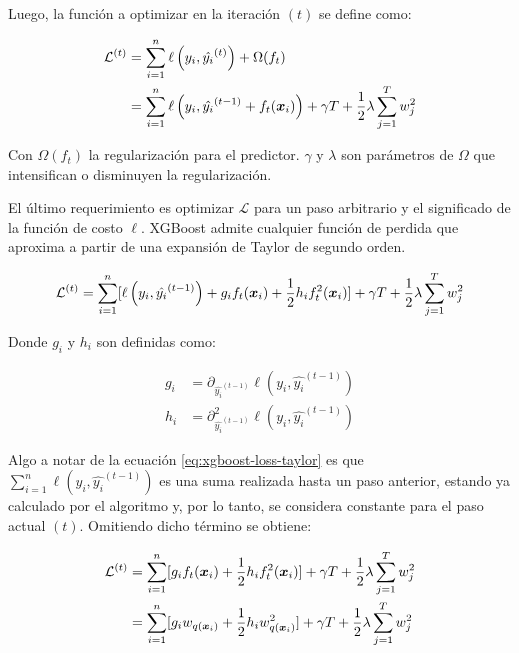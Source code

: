 Luego, la función a optimizar en la iteración $(t)$ se define como:

\begin{align}
    \mathcal{L}^{(t)} &= \sum_{i=1}^{n} \ell\left( y_i, \hat{y_i}^{(t)} \right) + \Omega(f_t) \\
                      &= \sum_{i=1}^{n} \ell\left( y_i, \hat{y_i}^{(t - 1)} + f_t{(\boldsymbol{x}_i)} \right) + \gamma T + \frac{1}{2} \lambda \sum_{j=1}^{T} w_{j}^{2}
\end{align}

Con $\Omega(f_t)$ la regularización para el predictor. $\gamma$ y $\lambda$ son
parámetros de $\Omega$ que intensifican o disminuyen la regularización.

El último requerimiento es optimizar $\mathcal{L}$ para un paso arbitrario y el
significado de la función de costo $\ell$. XGBoost admite cualquier función de
perdida que aproxima a partir de una expansión de Taylor de segundo orden.

\begin{equation} \label{eq:xgboost-loss-taylor}
    \mathcal{L}^{(t)} = \sum_{i = 1}^{n} [
        \ell\left(y_i,
                  \hat{y_{i}}^{(t-1)}
            \right) +
                g_i f_t(\boldsymbol{x}_i) +
                \frac{1}{2} h_i f_t^{2}(\boldsymbol{x}_i)
        ] + \gamma T + \frac{1}{2} \lambda \sum_{j=1}^{T} w_{j}^{2}
\end{equation}

Donde $g_i$ y $h_i$ son definidas como:

\begin{align}
    g_i &= \partial_{\hat{y_{i}}^{(t-1)}} \ell\left(y_i, \hat{y_{i}}^{(t-1)}\right) \\
    h_i &= \partial_{\hat{y_{i}}^{(t-1)}}^{2} \ell\left(y_i, \hat{y_{i}}^{(t-1)}\right)
\end{align}

Algo a notar de la ecuación \ref{eq:xgboost-loss-taylor} es que $\sum_{i =
1}^{n} \ell\left(y_i, \hat{y_{i}}^{(t-1)} \right)$ es una suma realizada hasta
un paso anterior, estando ya calculado por el algoritmo y, por lo tanto, se
considera constante para el paso actual $(t)$. Omitiendo dicho término se
obtiene:

\begin{align}
    \mathcal{L}^{(t)} &= \sum_{i = 1}^{n} [
        g_i f_t(\boldsymbol{x}_i) +
                \frac{1}{2} h_i f_t^{2}(\boldsymbol{x}_i)
        ] + \gamma T + \frac{1}{2} \lambda \sum_{j=1}^{T} w_{j}^{2} \\
                      &= \sum_{i = 1}^{n} [ \label{eq:xgboost-loss-final}
                        g_i w_{q(\boldsymbol{x}_i)} +
                                \frac{1}{2} h_i w_{q(\boldsymbol{x}_i)}^{2}
                        ] + \gamma T + \frac{1}{2} \lambda \sum_{j=1}^{T} w_{j}^{2}
\end{align}

